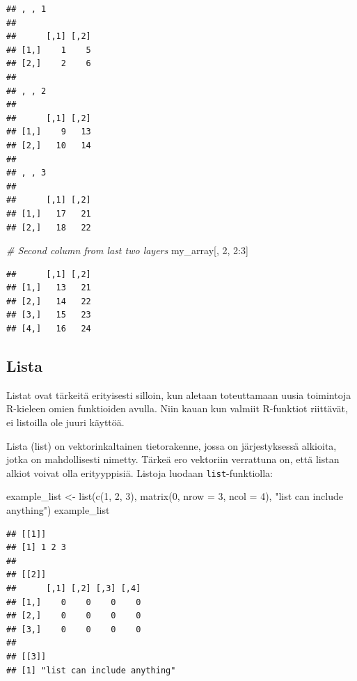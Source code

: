 \documentclass[
]{book}
\newenvironment{Shaded}{\begin{snugshade}}{\end{snugshade}}
\newcommand{\AttributeTok}[1]{\textcolor[rgb]{0.77,0.63,0.00}{#1}}
\newcommand{\CommentTok}[1]{\textcolor[rgb]{0.56,0.35,0.01}{\textit{#1}}}
\newcommand{\DecValTok}[1]{\textcolor[rgb]{0.00,0.00,0.81}{#1}}
\newcommand{\FunctionTok}[1]{\textcolor[rgb]{0.00,0.00,0.00}{#1}}
\newcommand{\NormalTok}[1]{#1}
\newcommand{\OtherTok}[1]{\textcolor[rgb]{0.56,0.35,0.01}{#1}}
\newcommand{\SpecialCharTok}[1]{\textcolor[rgb]{0.00,0.00,0.00}{#1}}
\newcommand{\StringTok}[1]{\textcolor[rgb]{0.31,0.60,0.02}{#1}}
\begin{document}
\begin{verbatim}
## , , 1
## 
##      [,1] [,2]
## [1,]    1    5
## [2,]    2    6
## 
## , , 2
## 
##      [,1] [,2]
## [1,]    9   13
## [2,]   10   14
## 
## , , 3
## 
##      [,1] [,2]
## [1,]   17   21
## [2,]   18   22
\end{verbatim}

\begin{Shaded}
\begin{Highlighting}[]
\CommentTok{\# Second column from last two layers}
\NormalTok{my\_array[, }\DecValTok{2}\NormalTok{, }\DecValTok{2}\SpecialCharTok{:}\DecValTok{3}\NormalTok{]}
\end{Highlighting}
\end{Shaded}

\begin{verbatim}
##      [,1] [,2]
## [1,]   13   21
## [2,]   14   22
## [3,]   15   23
## [4,]   16   24
\end{verbatim}

\hypertarget{lista}{%
\subsection{Lista}\label{lista}}

Listat ovat tärkeitä erityisesti silloin, kun aletaan toteuttamaan uusia toimintoja R-kieleen omien funktioiden avulla. Niin kauan kun valmiit R-funktiot riittävät, ei listoilla ole juuri käyttöä.

Lista (list) on vektorinkaltainen tietorakenne, jossa on järjestyksessä alkioita, jotka on mahdollisesti nimetty. Tärkeä ero vektoriin verrattuna on, että listan alkiot voivat olla erityyppisiä. Listoja luodaan \texttt{list}-funktiolla:

\begin{Shaded}
\begin{Highlighting}[]
\NormalTok{example\_list }\OtherTok{\textless{}{-}} \FunctionTok{list}\NormalTok{(}\FunctionTok{c}\NormalTok{(}\DecValTok{1}\NormalTok{, }\DecValTok{2}\NormalTok{, }\DecValTok{3}\NormalTok{),}
                     \FunctionTok{matrix}\NormalTok{(}\DecValTok{0}\NormalTok{, }\AttributeTok{nrow =} \DecValTok{3}\NormalTok{, }\AttributeTok{ncol =} \DecValTok{4}\NormalTok{),}
                     \StringTok{"list can include anything"}\NormalTok{)}
\NormalTok{example\_list}
\end{Highlighting}
\end{Shaded}

\begin{verbatim}
## [[1]]
## [1] 1 2 3
## 
## [[2]]
##      [,1] [,2] [,3] [,4]
## [1,]    0    0    0    0
## [2,]    0    0    0    0
## [3,]    0    0    0    0
## 
## [[3]]
## [1] "list can include anything"
\end{verbatim}
\end{document}
